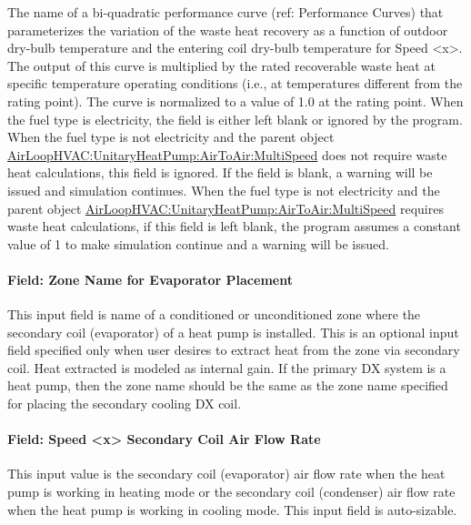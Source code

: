The name of a bi-quadratic performance curve (ref: Performance Curves) that parameterizes the variation of the waste heat recovery as a function of outdoor dry-bulb temperature and the entering coil dry-bulb temperature for Speed \textless{}x\textgreater{}. The output of this curve is multiplied by the rated recoverable waste heat at specific temperature operating conditions (i.e., at temperatures different from the rating point). The curve is normalized to a value of 1.0 at the rating point. When the fuel type is electricity, the field is either left blank or ignored by the program. When the fuel type is not electricity and the parent object \hyperref[airloophvacunitaryheatpumpairtoairmultispeed]{AirLoopHVAC:UnitaryHeatPump:AirToAir:MultiSpeed} does not require waste heat calculations, this field is ignored. If the field is blank, a warning will be issued and simulation continues. When the fuel type is not electricity and the parent object \hyperref[airloophvacunitaryheatpumpairtoairmultispeed]{AirLoopHVAC:UnitaryHeatPump:AirToAir:MultiSpeed} requires waste heat calculations, if this field is left blank, the program assumes a constant value of 1 to make simulation continue and a warning will be issued.

\paragraph{Field: Zone Name for Evaporator Placement}\label{field-zone-name-for-evaporator-placement-1}

This input field is name of a conditioned or unconditioned zone where the secondary coil (evaporator) of a heat pump is installed. This is an optional input field specified only when user desires to extract heat from the zone via secondary coil. Heat extracted is modeled as internal gain. If the primary DX system is a heat pump, then the zone name should be the same as the zone name specified for placing the secondary cooling DX coil.

\paragraph{Field: Speed \textless{}x\textgreater{} Secondary Coil Air Flow Rate}\label{field-speed-x-secondary-coil-air-flow-rate}

This input value is the secondary coil (evaporator) air flow rate when the heat pump is working in heating mode or the secondary coil (condenser) air flow rate when the heat pump is working in cooling mode. This input field is auto-sizable.

